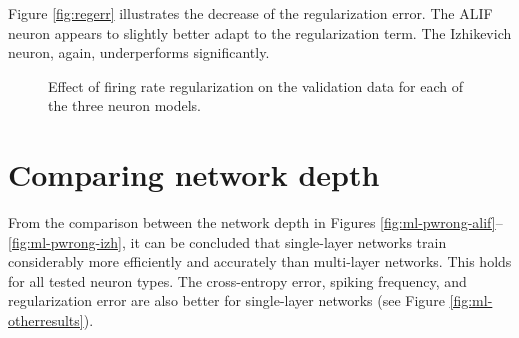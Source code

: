 		Figure \ref{fig:regerr} illustrates the decrease of the regularization error.
		The ALIF neuron appears to slightly better adapt to the regularization term.
		The Izhikevich neuron, again, underperforms significantly.
		\begin{figure}[bth]
		    \myfloatalign
		     \quad
		    \caption[Effect of firing rate regularization for each of the three neuron models.]{Effect of firing rate regularization on the validation data for each of the three neuron models.}\label{fig:sl-reg}
		\end{figure}

\section{Comparing network depth}
From the comparison between the network depth in Figures \ref{fig:ml-pwrong-alif}--\ref{fig:ml-pwrong-izh}, it can be concluded that single-layer networks train considerably more efficiently and accurately than multi-layer networks.
This holds for all tested neuron types.
The cross-entropy error, spiking frequency, and regularization error are also better for single-layer networks (see Figure \ref{fig:ml-otherresults}).

